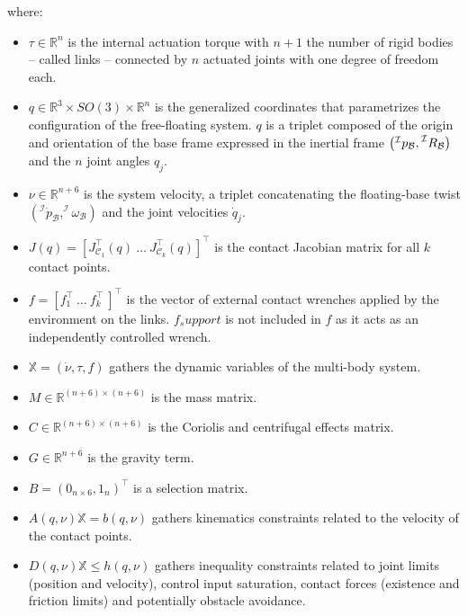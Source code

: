 \documentclass[12pt,a4paper,twoside]{article}
\begin{document}
where:
\begin{itemize}
\item $\tau \in \mathbb{R}^n$ is the internal actuation torque with $n + 1$ the number of rigid bodies -- called links -- connected by $n$ actuated joints with one degree of freedom each.
\item ${q} \in \mathbb{R}^3 \times SO(3)\times \mathbb{R}^n$ is the generalized coordinates that parametrizes the configuration of the free-floating system. $q$ is a triplet composed of the origin and orientation of the base frame expressed in the inertial frame $\left(\prescript{\mathcal{I}}{}p_{\mathcal{B}},\prescript{\mathcal{I}}{}R_{\mathcal{B}}\right)$ and the $n$ joint angles $q_j$.
\item ${\nu} \in \mathbb{R}^{n+6}$ is the system velocity, a triplet concatenating the floating-base twist $\left (^\mathcal{I}\dot{ p}_{\mathcal{B}},^\mathcal{I}\omega_{\mathcal{B}}\right)$ and the joint velocities ${\dot{q}}_j$.
\item ${J}({q})= \left[{J}^\top _{\mathcal{C}_1}({q})~ \dots~ {J}^\top _{\mathcal{C}_k}({q}) \right]^\top$ is the contact Jacobian matrix for all $k$ contact points.
\item $f= \left[ {f}^\top_{1}~ \dots~ {f}^\top_{k}~ \right]^\top $ is the vector of external contact wrenches applied by the environment on the links. $f_support$ is not included in $f$ as it acts as an independently controlled wrench.
\item $\mathbb{X} = \left(\dot{\nu}, \tau, f \right)$ gathers the dynamic variables of the multi-body system.
\item ${M} \in \mathbb{R}^{(n+6) \times (n+6)}$ is the mass matrix.
\item ${C} \in \mathbb{R}^{(n+6) \times (n+6)}$ is the Coriolis and centrifugal effects matrix.
\item ${G} \in \mathbb{R}^{n+6}$ is the gravity term.
\item $B = (0_{n\times 6} , 1_n)^\top$ is a selection matrix.
\item ${A}(q,\nu) \mathbb{X}   =  {b}(q,\nu)$ gathers kinematics constraints related to the velocity of the contact points.
\item ${D}(q,\nu) \mathbb{X} \leq {h}(q,\nu)$ gathers inequality constraints related to joint limits (position and velocity), control input saturation, contact forces (existence and friction limits) and potentially obstacle avoidance.
\end{itemize}
\end{document}
